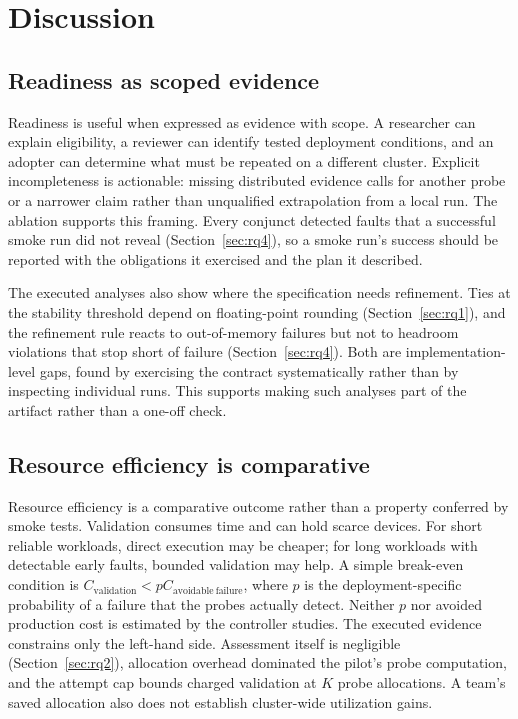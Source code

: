 \section{Discussion}\label{sec:discussion}
\subsection{Readiness as scoped evidence}
Readiness is useful when expressed as evidence with scope. A researcher can explain eligibility, a reviewer can identify tested deployment conditions, and an adopter can determine what must be repeated on a different cluster. Explicit incompleteness is actionable: missing distributed evidence calls for another probe or a narrower claim rather than unqualified extrapolation from a local run. The ablation supports this framing. Every conjunct detected faults that a successful smoke run did not reveal (Section~\ref{sec:rq4}), so a smoke run's success should be reported with the obligations it exercised and the plan it described.

The executed analyses also show where the specification needs refinement. Ties at the stability threshold depend on floating-point rounding (Section~\ref{sec:rq1}), and the refinement rule reacts to out-of-memory failures but not to headroom violations that stop short of failure (Section~\ref{sec:rq4}). Both are implementation-level gaps, found by exercising the contract systematically rather than by inspecting individual runs. This supports making such analyses part of the artifact rather than a one-off check.

\subsection{Resource efficiency is comparative}
Resource efficiency is a comparative outcome rather than a property conferred by smoke tests. Validation consumes time and can hold scarce devices. For short reliable workloads, direct execution may be cheaper; for long workloads with detectable early faults, bounded validation may help. A simple break-even condition is $C_{\mathrm{validation}}<pC_{\mathrm{avoidable\ failure}}$, where $p$ is the deployment-specific probability of a failure that the probes actually detect. Neither $p$ nor avoided production cost is estimated by the controller studies. The executed evidence constrains only the left-hand side. Assessment itself is negligible (Section~\ref{sec:rq2}), allocation overhead dominated the pilot's probe computation, and the attempt cap bounds charged validation at $K$ probe allocations. A team's saved allocation also does not establish cluster-wide utilization gains.

